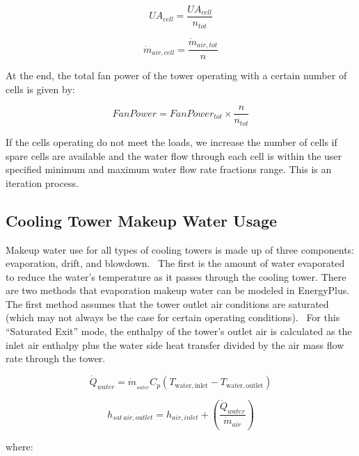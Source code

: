 \begin{equation}
U{A_{cell}} = \frac{{U{A_{cell}}}}{{{n_{tot}}}}
\end{equation}

\begin{equation}
{\dot m_{air,cell}} = \frac{{{{\dot m}_{air,tot}}}}{n}
\end{equation}

At the end, the total fan power of the tower operating with a certain number of cells is given by:

\begin{equation}
FanPower = FanPowe{r_{tot}} \times \frac{n}{{{n_{tot}}}}
\end{equation}

If the cells operating do not meet the loads, we increase the number of cells if spare cells are available and the water flow through each cell is within the user specified minimum and maximum water flow rate fractions range. This is an iteration process.

\subsection{Cooling Tower Makeup Water Usage}\label{cooling-tower-makeup-water-usage-1}

Makeup water use for all types of cooling towers is made up of three components: evaporation, drift, and blowdown. ~The first is the amount of water evaporated to reduce the water's temperature as it passes through the cooling tower. There are two methods that evaporation makeup water can be modeled in EnergyPlus.~ The first method assumes that the tower outlet air conditions are saturated (which may not always be the case for certain operating conditions). ~For this ``Saturated Exit'' mode, the enthalpy of the tower's outlet air is calculated as the inlet air enthalpy plus the water side heat transfer divided by the air mass flow rate through the tower.

\begin{equation}
{\dot Q_{water}} = {\dot m_{_{water}}}{C_p}\left( {{T_{{\mathrm{water,inlet}}}} - {T_{{\mathrm{water,outlet}}}}} \right)
\end{equation}

\begin{equation}
{h_{sat\,air,outlet}} = {h_{air,inlet}} + \left( {\frac{{{{\dot Q}_{water}}}}{{{{\dot m}_{air}}}}} \right)
\end{equation}

where:

